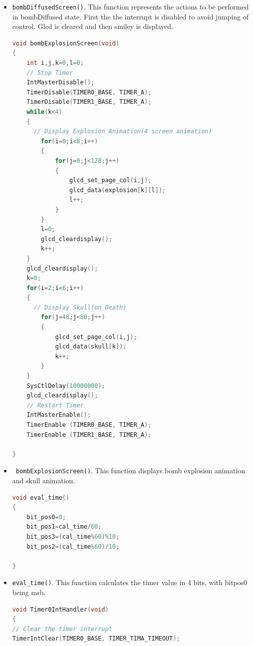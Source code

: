 \documentclass{article}
\begin{document}
\begin{itemize}
\begin{lstlisting}[basicstyle = \small, language = C]
}
  \end{lstlisting}
  \item \texttt{bombDiffusedScreen()}. This function represents the actions to be performed in bombDiffused state. First the the interrupt is disabled to avoid jumping of control. Glcd is cleared and then smiley is displayed.
      \begin{lstlisting}[basicstyle = \small, language = C]
void bombExplosionScreen(void)
{
    int i,j,k=0,l=0;
    // Stop Timer
    IntMasterDisable();
    TimerDisable(TIMER0_BASE, TIMER_A);
    TimerDisable(TIMER1_BASE, TIMER_A);
    while(k<4)
    {
      // Display Explosion Animation(4 screen animation)
        for(i=0;i<8;i++)
        {
            for(j=0;j<128;j++)
            {
                glcd_set_page_col(i,j);
                glcd_data(explosion[k][l]);
                l++;
            }
        }
        l=0;
        glcd_cleardisplay();
        k++;
    }
    glcd_cleardisplay();
    k=0;
    for(i=2;i<6;i++)
    {
      // Display Skull(on Death)
        for(j=48;j<80;j++)
        {
            glcd_set_page_col(i,j);
            glcd_data(skull[k]);
            k++;
        }
    }
    SysCtlDelay(10000000);
    glcd_cleardisplay();
    // Restart Timer
    IntMasterEnable();
    TimerEnable (TIMER0_BASE, TIMER_A);
    TimerEnable (TIMER1_BASE, TIMER_A);

}
  \end{lstlisting}
  \item \texttt{ bombExplosionScreen()}. This function displays bomb explosion animation and skull animation.
      \begin{lstlisting}[basicstyle = \small, language = C]
void eval_time()
{
    bit_pos0=0;
    bit_pos1=cal_time/60;
    bit_pos3=(cal_time%60)%10;
    bit_pos2=(cal_time%60)/10;

}
  \end{lstlisting}
  \item \texttt{eval\_time()}. This function calculates the timer value in 4 bits, with bitpos0 being msb. 
      \begin{lstlisting}[basicstyle = \small, language = C]
void Timer0IntHandler(void)
{
// Clear the timer interrupt
TimerIntClear(TIMER0_BASE, TIMER_TIMA_TIMEOUT);


\end{lstlisting}
\end{itemize}
\end{document}
